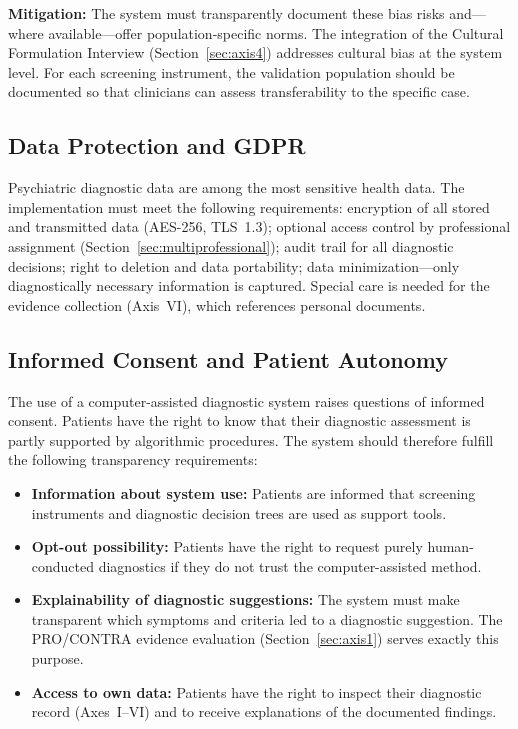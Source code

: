 \documentclass[11pt,a4paper]{article}
\begin{document}
\textbf{Mitigation:} The system must transparently document these bias risks and---where available---offer population-specific norms. The integration of the Cultural Formulation Interview (Section~\ref{sec:axis4}) addresses cultural bias at the system level. For each screening instrument, the validation population should be documented so that clinicians can assess transferability to the specific case.

\subsection{Data Protection and GDPR}

Psychiatric diagnostic data are among the most sensitive health data. The implementation must meet the following requirements: encryption of all stored and transmitted data (AES-256, TLS~1.3); optional access control by professional assignment (Section~\ref{sec:multiprofessional}); audit trail for all diagnostic decisions; right to deletion and data portability; data minimization---only diagnostically necessary information is captured. Special care is needed for the evidence collection (Axis~VI), which references personal documents.

\subsection{Informed Consent and Patient Autonomy}

The use of a computer-assisted diagnostic system raises questions of informed consent. Patients have the right to know that their diagnostic assessment is partly supported by algorithmic procedures. The system should therefore fulfill the following transparency requirements:

\begin{itemize}[noitemsep]
\item \textbf{Information about system use:} Patients are informed that screening instruments and diagnostic decision trees are used as support tools.
\item \textbf{Opt-out possibility:} Patients have the right to request purely human-conducted diagnostics if they do not trust the computer-assisted method.
\item \textbf{Explainability of diagnostic suggestions:} The system must make transparent which symptoms and criteria led to a diagnostic suggestion. The PRO/CONTRA evidence evaluation (Section~\ref{sec:axis1}) serves exactly this purpose.
\item \textbf{Access to own data:} Patients have the right to inspect their diagnostic record (Axes~I--VI) and to receive explanations of the documented findings.
\end{itemize}
\end{document}
